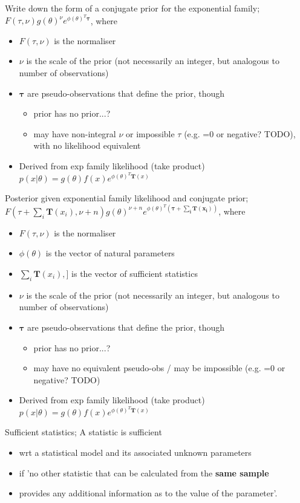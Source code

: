 \documentclass{article}
\begin{document}
Write down the form of a conjugate prior for the exponential family; $F(\tau, \nu)g(\theta)^\nu e^{\phi (\theta)^T\mathbf{\tau}}$, where \begin{itemize} \item $F(\tau, \nu)$ is the normaliser \item $\nu$ is the scale of the prior (not necessarily an integer, but analogous to number of observations) \item $\mathbf{\tau}$ are pseudo-observations that define the prior, though \begin{itemize} \item prior has no prior...?  \item may have non-integral $\nu$ or impossible $\tau$ (e.g. =0 or negative? TODO), with no likelihood equivalent \end{itemize} \item Derived from exp family likelihood (take product) $p(x|\theta) = g(\theta)f(x)e^{\phi(\theta)^T\mathbf{T}(x)}$ \end{itemize}

Posterior given exponential family likelihood and conjugate prior; $F(\tau + \sum_i\mathbf{T}(x_i), \nu + n)g(\theta)^{\nu+n} e^{\phi (\theta)^T\mathbf{(\tau+\sum_i\mathbf{T}(x_i))}}$, where \begin{itemize} \item $F(\tau, \nu)$ is the normaliser \item $\phi(\theta)$ is the vector of natural parameters \item $\sum_i\mathbf{T}(x_i),]$ is the vector of sufficient statistics \item $\nu$ is the scale of the prior (not necessarily an integer, but analogous to number of observations) \item $\mathbf{\tau}$ are pseudo-observations that define the prior, though \begin{itemize} \item prior has no prior...?  \item may have no equivalent pseudo-obs / may be impossible (e.g. =0 or negative? TODO) \end{itemize} \item Derived from exp family likelihood (take product) $p(x|\theta) = g(\theta)f(x)e^{\phi(\theta)^T\mathbf{T}(x)}$ \end{itemize}

Sufficient statistics; A statistic is sufficient \begin{itemize} \item wrt a statistical model and its associated unknown parameters \item if 'no other statistic that can be calculated from the \textbf{same sample} \item provides any additional information as to the value of the parameter'.  \end{itemize}
\end{document}
